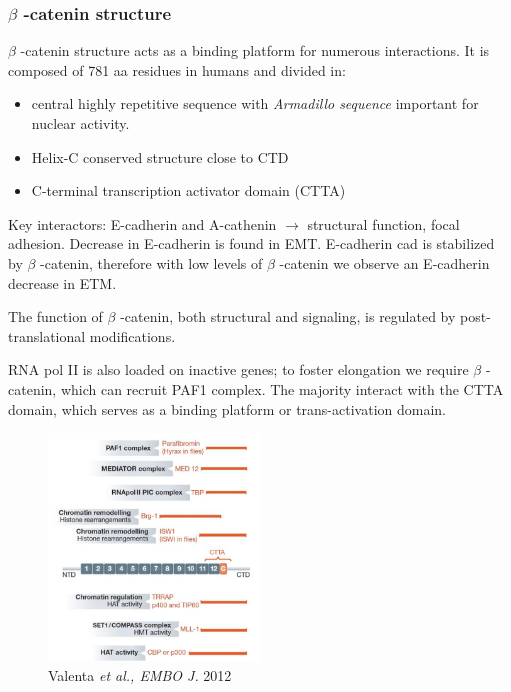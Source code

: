 \hypertarget{ux3b2-catenin-structure}{%
\subsubsection{$\beta$  -catenin structure}\label{ux3b2-catenin-structure}}

$\beta$  -catenin structure acts as a binding platform for numerous interactions. It is composed of 781 aa residues in humans and divided in:

\begin{itemize}
\tightlist
\item
  central highly repetitive sequence with \emph{Armadillo sequence} important for nuclear activity.
\item
  Helix-C conserved structure close to CTD
\item
  C-terminal transcription activator domain (CTTA)
\end{itemize}

Key interactors: E-cadherin and A-cathenin $\rightarrow$ structural function, focal adhesion. Decrease in E-cadherin is found in EMT. E-cadherin cad is stabilized by $\beta$  -catenin, therefore with low levels of $\beta$  -catenin we observe an E-cadherin decrease in ETM.

The function of $\beta$  -catenin, both structural and signaling, is regulated by post-translational modifications.

RNA pol II is also loaded on inactive genes; to foster elongation we require $\beta$  -catenin, which can recruit PAF1 complex. The majority interact with the CTTA domain, which serves as a binding platform or trans-activation domain.

\begin{figure}
\centering
\includegraphics[width=0.5\textwidth]{../_resources/Screenshot_2022-10-07_at_11-52-13.png}
\caption{Valenta \emph{et al., EMBO J.} 2012}
\end{figure}

